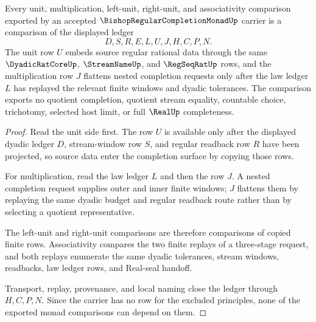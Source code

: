 \begin{theorem}
\label{thm:bishop-regular-completion-monad-unit-multiplication-ledger}
Every unit, multiplication, left-unit, right-unit, and associativity comparison exported by an accepted $\BishopRegularCompletionMonadUp$ carrier is a comparison of the displayed ledger
$$
D,S,R,E,L,U,J,H,C,P,N .
$$
The unit row $U$ embeds source regular rational data through the same $\DyadicRatCoreUp$, $\StreamNameUp$, and $\RegSeqRatUp$ rows, and the multiplication row $J$ flattens nested completion requests only after the law ledger $L$ has replayed the relevant finite windows and dyadic tolerances. The comparison exports no quotient completion, quotient stream equality, countable choice, trichotomy, selected host limit, or full $\RealUp$ completeness.
\end{theorem}
\begin{proof}
Read the unit side first. The row $U$ is available only after the displayed dyadic ledger $D$, stream-window row $S$, and regular readback row $R$ have been projected, so source data enter the completion surface by copying those rows.

For multiplication, read the law ledger $L$ and then the row $J$. A nested completion request supplies outer and inner finite windows; $J$ flattens them by replaying the same dyadic budget and regular readback route rather than by selecting a quotient representative.

The left-unit and right-unit comparisons are therefore comparisons of copied finite rows. Associativity compares the two finite replays of a three-stage request, and both replays enumerate the same dyadic tolerances, stream windows, readbacks, law ledger rows, and Real-seal handoff.

Transport, replay, provenance, and local naming close the ledger through $H,C,P,N$. Since the carrier has no row for the excluded principles, none of the exported monad comparisons can depend on them.
\end{proof}


